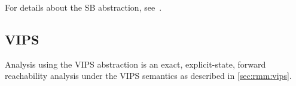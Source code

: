 \documentclass[a4paper]{article}
\begin{document}
For details about the SB abstraction, see~\cite{AACLR12}.

\subsection{VIPS}

Analysis using the VIPS abstraction is an exact, explicit-state,
forward reachability analysis under the VIPS semantics as described in
\cref{sec:rmm:vips}.

{}



\pagebreak
{}
{}

\end{document}
